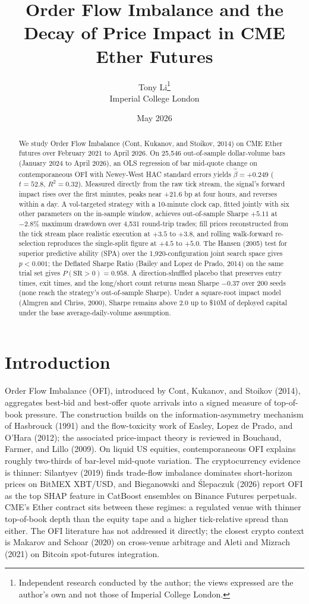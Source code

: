 ﻿\documentclass[11pt,a4paper]{article}
\title{\vspace{-3em}\textbf{Order Flow Imbalance and the Decay of Price Impact in CME Ether Futures}}
\author{Tony Li\thanks{Independent research conducted by the author; the views expressed are the author's own and not those of Imperial College London.}\\ \normalsize Imperial College London}
\date{May 2026}
\begin{document}
\maketitle

\begin{abstract}
\noindent We study Order Flow Imbalance (Cont, Kukanov, and Stoikov, 2014) on CME Ether futures over February 2021 to April 2026. On 25{,}546 out-of-sample dollar-volume bars (January 2024 to April 2026), an OLS regression of bar mid-quote change on contemporaneous OFI with Newey-West HAC standard errors yields $\hat{\beta} = +0.249$ ($t = 52.8$, $R^2 = 0.32$). Measured directly from the raw tick stream, the signal's forward impact rises over the first minutes, peaks near +21.6 bp at four hours, and reverses within a day. A vol-targeted strategy with a 10-minute clock cap, fitted jointly with six other parameters on the in-sample window, achieves out-of-sample Sharpe $+5.11$ at $-2.8\%$ maximum drawdown over 4{,}531 round-trip trades; fill prices reconstructed from the tick stream place realistic execution at $+3.5$ to $+3.8$, and rolling walk-forward re-selection reproduces the single-split figure at $+4.5$ to $+5.0$. The Hansen (2005) test for superior predictive ability (SPA) over the 1{,}920-configuration joint search space gives $p < 0.001$; the Deflated Sharpe Ratio (Bailey and Lopez de Prado, 2014) on the same trial set gives $P(\mathrm{SR}>0) = 0.958$. A direction-shuffled placebo that preserves entry times, exit times, and the long/short count returns mean Sharpe $-0.37$ over 200 seeds (none reach the strategy's out-of-sample Sharpe). Under a square-root impact model (Almgren and Chriss, 2000), Sharpe remains above $2.0$ up to \$10M of deployed capital under the base average-daily-volume assumption.
\end{abstract}

\section{Introduction}

Order Flow Imbalance (OFI), introduced by Cont, Kukanov, and Stoikov (2014), aggregates best-bid and best-offer quote arrivals into a signed measure of top-of-book pressure. The construction builds on the information-asymmetry mechanism of Hasbrouck (1991) and the flow-toxicity work of Easley, Lopez de Prado, and O'Hara (2012); the associated price-impact theory is reviewed in Bouchaud, Farmer, and Lillo (2009). On liquid US equities, contemporaneous OFI explains roughly two-thirds of bar-level mid-quote variation. The cryptocurrency evidence is thinner: Silantyev (2019) finds trade-flow imbalance dominates short-horizon prices on BitMEX XBT/USD, and Bieganowski and Ślepaczuk (2026) report OFI as the top SHAP feature in CatBoost ensembles on Binance Futures perpetuals. CME's Ether contract sits between these regimes: a regulated venue with thinner top-of-book depth than the equity tape and a higher tick-relative spread than either. The OFI literature has not addressed it directly; the closest crypto context is Makarov and Schoar (2020) on cross-venue arbitrage and Aleti and Mizrach (2021) on Bitcoin spot-futures integration.
\end{document}
